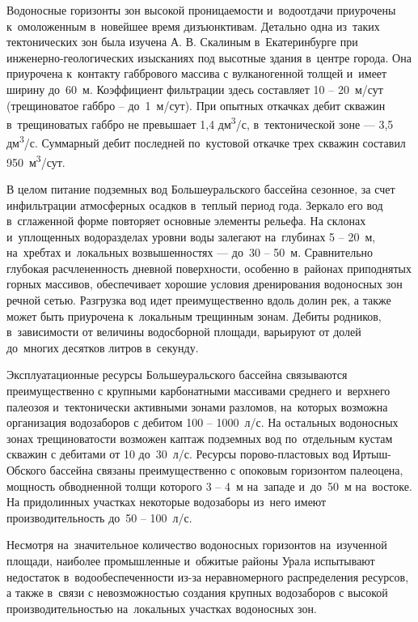 Водоносные горизонты зон высокой проницаемости и~водоотдачи приурочены к~омоложенным в~новейшее время дизъюнктивам. Детально одна из~таких тектонических зон была изучена А. В. Скалиным в~Екатеринбурге
при инженерно-геологических изысканиях под высотные здания в~центре города. Она приурочена к~контакту габбрового массива с вулканогенной толщей и~имеет ширину до~60~м. Коэффициент фильтрации здесь составляет 10  --  20~м/сут (трещиноватое габбро  --  до~1~м/сут). При опытных откачках дебит скважин в~трещиноватых габбро не превышает 1,4 дм\textsuperscript{3}/с, в~тектонической зоне  ---  3,5 дм\textsuperscript{3}/с. Суммарный дебит последней по~кустовой откачке трех скважин составил 950~м\textsuperscript{3}/сут.

В целом питание подземных вод Большеуральского бассейна сезонное, за счет инфильтрации атмосферных осадков в~теплый период года. Зеркало его вод в~сглаженной форме повторяет основные элементы рельефа. На склонах и~уплощенных водоразделах уровни воды залегают на~глубинах 5  --  20~м, на~хребтах и~локальных возвышенностях  ---  до~30  --  50~м. Сравнительно глубокая расчлененность дневной поверхности, особенно в~районах приподнятых горных массивов, обеспечивает хорошие условия дренирования водоносных зон речной сетью. Разгрузка вод идет преимущественно вдоль долин рек, а также может быть приурочена к~локальным трещинным зонам. Дебиты родников, в~зависимости от величины водосборной площади, варьируют от долей до~многих десятков литров в~секунду.

Эксплуатационные ресурсы Большеуральского бассейна связываются преимущественно с крупными карбонатными массивами среднего и~верхнего палеозоя и~тектонически активными зонами разломов, на~которых возможна организация водозаборов с дебитом 100  --  1000~л/с. На остальных водоносных зонах трещиноватости возможен каптаж подземных вод по~отдельным кустам скважин с дебитами от 10 до~30~л/с. Ресурсы порово-пластовых вод Иртыш-Обского бассейна связаны преимущественно с опоковым горизонтом палеоцена, мощность обводненной толщи которого 3  --  4~м на~западе и~до~50~м на~востоке. На придолинных участках некоторые водозаборы из~него имеют производительность до~50 -- 100~л/с.

Несмотря на~значительное количество водоносных горизонтов на~изученной площади, наиболее промышленные и~обжитые районы Урала испытывают недостаток в~водообеспеченности из-за неравномерного распределения ресурсов, а также в~связи с невозможностью создания крупных водозаборов с высокой производительностью на~локальных участках водоносных зон.
